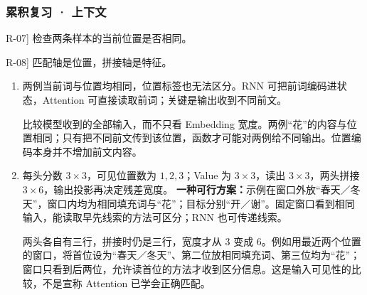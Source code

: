 \subsubsection*{累积复习 · 上下文}
\begin{answerhints}
\item[\hyperref[exercise:review-context-evidence]{R-07}] \leavevmode{}\label{hint:review-context-evidence}检查两条样本的当前位置是否相同。
\item[\hyperref[exercise:review-multihead-shapes]{R-08}] \leavevmode{}\label{hint:review-multihead-shapes}匹配轴是位置，拼接轴是特征。
\end{answerhints}
\begin{enumerate}[label={},leftmargin=4.8em,itemsep=4pt]
\item[\textbf{\hyperref[exercise:review-context-evidence]{R-07.}}] \leavevmode{}\label{solution:R-07}\label{solution:review-context-evidence}两例当前词与位置均相同，位置标签也无法区分。RNN 可把前词编码进状态，Attention 可直接读取前词；关键是输出收到不同前文。\par 比较模型收到的全部输入，而不只看 Embedding 宽度。两例“花”的内容与位置相同；只有把不同前文传到该位置，函数才可能对两例给不同输出。位置编码本身并不增加前文内容。
\item[\textbf{\hyperref[exercise:review-multihead-shapes]{R-08.}}] \leavevmode{}\label{solution:R-08}\label{solution:review-multihead-shapes}每头分数 $3\times3$，可见位置数为 $1,2,3$；Value 为 $3\times3$，读出 $3\times3$，两头拼接 $3\times6$，输出投影再决定残差宽度。
\textbf{一种可行方案：}示例在窗口外放“春天／冬天”，窗口内均为相同填充词与“花”；目标分别“开／谢”。固定窗口看到相同输入，能读取早先线索的方法可区分；RNN 也可传递线索。\par 两头各自有三行，拼接时仍是三行，宽度才从 $3$ 变成 $6$。例如用最近两个位置的窗口，将首位设为“春天／冬天”、第二位放相同填充词、第三位均为“花”；窗口只看到后两位，允许读首位的方法才收到区分信息。这是输入可见性的比较，不是宣称 Attention 已学会正确匹配。
\end{enumerate}
